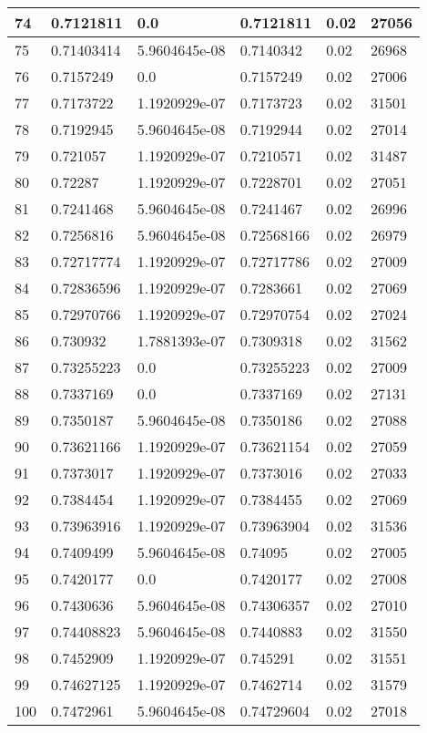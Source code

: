 \begin{longtable}{|l|l|l|l|l|l|}
74 & 0.7121811 & 0.0 & 0.7121811 & 0.02 & 27056 \\ \hline 
75 & 0.71403414 & 5.9604645e-08 & 0.7140342 & 0.02 & 26968 \\ \hline 
76 & 0.7157249 & 0.0 & 0.7157249 & 0.02 & 27006 \\ \hline 
77 & 0.7173722 & 1.1920929e-07 & 0.7173723 & 0.02 & 31501 \\ \hline 
78 & 0.7192945 & 5.9604645e-08 & 0.7192944 & 0.02 & 27014 \\ \hline 
79 & 0.721057 & 1.1920929e-07 & 0.7210571 & 0.02 & 31487 \\ \hline 
80 & 0.72287 & 1.1920929e-07 & 0.7228701 & 0.02 & 27051 \\ \hline 
81 & 0.7241468 & 5.9604645e-08 & 0.7241467 & 0.02 & 26996 \\ \hline 
82 & 0.7256816 & 5.9604645e-08 & 0.72568166 & 0.02 & 26979 \\ \hline 
83 & 0.72717774 & 1.1920929e-07 & 0.72717786 & 0.02 & 27009 \\ \hline 
84 & 0.72836596 & 1.1920929e-07 & 0.7283661 & 0.02 & 27069 \\ \hline 
85 & 0.72970766 & 1.1920929e-07 & 0.72970754 & 0.02 & 27024 \\ \hline 
86 & 0.730932 & 1.7881393e-07 & 0.7309318 & 0.02 & 31562 \\ \hline 
87 & 0.73255223 & 0.0 & 0.73255223 & 0.02 & 27009 \\ \hline 
88 & 0.7337169 & 0.0 & 0.7337169 & 0.02 & 27131 \\ \hline 
89 & 0.7350187 & 5.9604645e-08 & 0.7350186 & 0.02 & 27088 \\ \hline 
90 & 0.73621166 & 1.1920929e-07 & 0.73621154 & 0.02 & 27059 \\ \hline 
91 & 0.7373017 & 1.1920929e-07 & 0.7373016 & 0.02 & 27033 \\ \hline 
92 & 0.7384454 & 1.1920929e-07 & 0.7384455 & 0.02 & 27069 \\ \hline 
93 & 0.73963916 & 1.1920929e-07 & 0.73963904 & 0.02 & 31536 \\ \hline 
94 & 0.7409499 & 5.9604645e-08 & 0.74095 & 0.02 & 27005 \\ \hline 
95 & 0.7420177 & 0.0 & 0.7420177 & 0.02 & 27008 \\ \hline 
96 & 0.7430636 & 5.9604645e-08 & 0.74306357 & 0.02 & 27010 \\ \hline 
97 & 0.74408823 & 5.9604645e-08 & 0.7440883 & 0.02 & 31550 \\ \hline 
98 & 0.7452909 & 1.1920929e-07 & 0.745291 & 0.02 & 31551 \\ \hline 
99 & 0.74627125 & 1.1920929e-07 & 0.7462714 & 0.02 & 31579 \\ \hline 
100 & 0.7472961 & 5.9604645e-08 & 0.74729604 & 0.02 & 27018 \\ \hline 
\end{longtable}